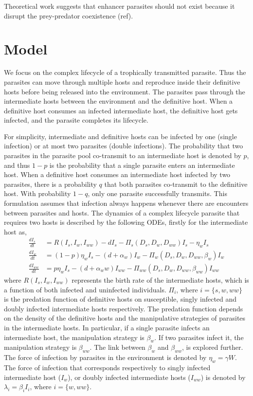 \documentclass{article}
\begin{document}
Theoretical work suggests that enhancer parasites should not exist because it disrupt the prey-predator coexistence (ref). 
\section{Model}
We focus on the complex lifecycle of a trophically transmitted parasite. 
Thus the parasites can move through multiple hosts and reproduce inside their definitive hosts before being released into the environment. 
The parasites pass through the intermediate hosts between the environment and the definitive host.
When a definitive host consumes an infected intermediate host, the definitive host gets infected, and the parasite completes its lifecycle.

For simplicity, intermediate and definitive hosts can be infected by one (single infection) or at most two parasites (double infections). 
The probability that two parasites in the parasite pool co-transmit to an intermediate host is denoted by  $p$, and thus $1-p$ is the probability that a single parasite enters an intermediate host. 
When a definitive host consumes an intermediate host infected by two parasites, there is a probability $q$ that both parasites co-transmit to the definitive host.
With probability $1-q$, only one parasite successfully transmits. 
This formulation assumes that infection always happens whenever there are encounters between parasites and hosts.
The dynamics of a complex lifecycle parasite that requires two hosts is described by the following ODEs, firstly for the intermediate host as,
%
\begin{align}
\frac{dI_s}{dt} &= R(I_s, I_w, I_{ww}) - d I_s - \Pi_s(D_s, D_w, D_{ww}) I_s  - \eta_w  I_s \nonumber \\ 
\frac{dI_w}{dt} &=  (1 - p) \eta_w I_s  - (d + \alpha_w) I_w - \Pi_w(D_s, D_w, D_{ww}, \beta_w) I_w \label{odes:ihosts} \\
\frac{dI_{ww}}{dt} &= p \eta_w I_s  - (d + \alpha_ww) I_{ww} - \Pi_{ww}(D_s, D_w, D_{ww}, \beta_{ww}) I_{ww} \nonumber
\end{align}
%
where $R(I_s, I_w, I_{ww})$ represents the birth rate of the intermediate hosts, which is a function of both infected and uninfected individuals. 
$\Pi_i$, where $i = \{s, w, ww\}$ is the predation function of definitive hosts on susceptible, singly infected and doubly infected intermediate hosts respectively. 
The predation function depends on the density of the definitive hosts and the manipulative strategies of parasites in the intermediate hosts. 
In particular, if a single parasite infects an intermediate host, the manipulation strategy is $\beta_w$. 
If two parasites infect it, the manipulation strategy is $\beta_{ww}$. 
The link between $\beta_w$ and $\beta_{ww}$, is explored further. 
The force of infection by parasites in the environment is denoted by $\eta_w = \gamma W$. 
The force of infection that corresponds respectively to singly infected intermediate host ($I_w$), or doubly infected intermediate hosts ($I_{ww}$) is denoted by $\lambda_i = \beta_i I_i$, where $i = \{ w, ww\}$. 
\end{document}
